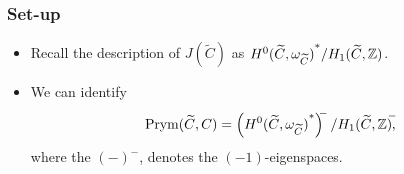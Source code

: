\begin{frame}
\frametitle{Set-up}

\begin{itemize}
	\item Recall the description of $J(\widetilde C)$ as ${H^0(\widetilde C, \omega_{\widetilde C})}^{\ast}/H_1(\widetilde C, \mathbb{Z})$.
	\item We can identify
	\alert{
	\[
	\operatorname{Prym}(\widetilde C, C) = \left({H^0(\widetilde C, \omega_{\widetilde C})}^{\ast}\right)^{\mkern-7mu-} / {H_1(\widetilde C, \mathbb{Z})}^{\mkern-7mu-}\mkern-7mu,
	\]
	}
	where the $(-)^-$, denotes the $(-1)$-eigenspaces.
\end{itemize}



\end{frame}


    \begin{frame}[plain]
     \end{frame}

